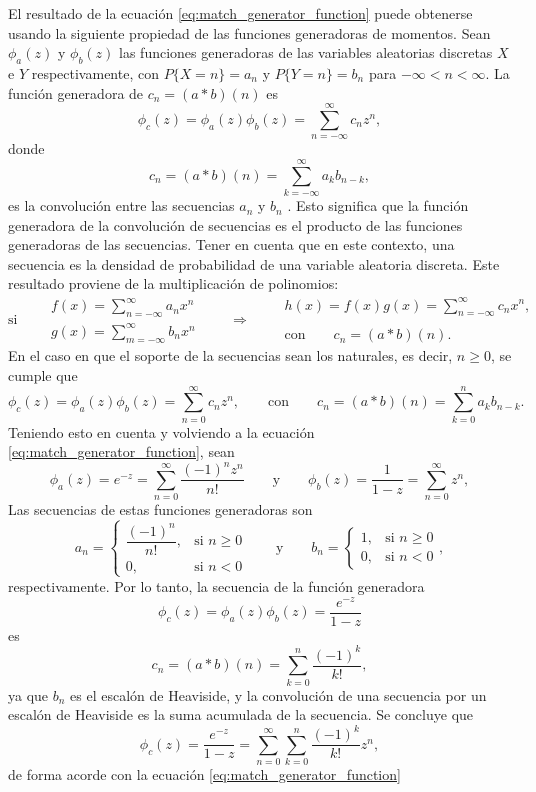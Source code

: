 \documentclass[a4paper]{report}
\begin{document}
El resultado de la ecuación \ref{eq:match_generator_function} puede obtenerse usando la siguiente propiedad de las funciones generadoras de momentos. Sean \(\phi_a(z)\) y \(\phi_b(z)\) las funciones generadoras de las variables aleatorias discretas \(X\) e \(Y\) respectivamente, con \(P\{X=n\}=a_n\) y \(P\{Y=n\}=b_n\) para \(-\infty<n<\infty\). La función generadora de \(c_n=(a*b)(n)\) es
\[
 \phi_c(z)=\phi_a(z)\phi_b(z)=\sum_{n=-\infty}^{\infty}c_nz^n,
\]
donde
\[
 c_n=(a*b)(n)=\sum_{k=-\infty}^{\infty}a_kb_{n-k},
\]
es la convolución entre las secuencias \(a_n\) y \(b_n\) \cite{miller2017probability_chap19}. Esto significa que la función generadora de la convolución de secuencias es el producto de las funciones generadoras de las secuencias. Tener en cuenta que en este contexto, una secuencia es la densidad de probabilidad de una variable aleatoria discreta. Este resultado proviene de la multiplicación de polinomios:
\[
  \textrm{si}\qquad
  \begin{array}{l} 
  \displaystyle f(x)=\sum_{n=-\infty}^{\infty}a_nx^n\\
  \displaystyle g(x)=\sum_{m=-\infty}^{\infty}b_nx^n \end{array}
  \qquad\Rightarrow\qquad 
  \begin{array}{l} 
  \displaystyle h(x)=f(x)g(x)=\sum_{n=-\infty}^{\infty}c_nx^n,\\
  \\
  \textrm{con}\qquad c_n=(a*b)(n). \end{array}
 \]
En el caso en que el soporte de la secuencias sean los naturales, es decir, \(n\geq0\), se cumple que
\[
 \phi_c(z)=\phi_a(z)\phi_b(z)=\sum_{n=0}^{\infty}c_nz^n,\qquad\textrm{con}\qquad c_n=(a*b)(n)=\sum_{k=0}^{n}a_kb_{n-k}.
\]
Teniendo esto en cuenta y volviendo a la ecuación \ref{eq:match_generator_function}, sean
\[
 \phi_a(z)=e^{-z}=\sum_{n=0}^{\infty}\frac{(-1)^nz^n}{n!}\qquad\textrm{y}\qquad 
 \phi_b(z)=\frac{1}{1-z}=\sum_{n=0}^{\infty}z^n,
\]
Las secuencias de estas funciones generadoras son
\[
 a_n=
 \left\{\begin{array}{ll}
  \dfrac{(-1)^n}{n!}, & \textrm{si }n\geq 0 \\
  0, & \textrm{si }n<0
 \end{array} \right.
 \qquad\textrm{y}\qquad
 b_n=
 \left\{\begin{array}{ll}
  1, & \textrm{si }n\geq 0 \\
  0, & \textrm{si }n<0
 \end{array}, \right.
\]
respectivamente. Por lo tanto, la secuencia de la función generadora
\[
 \phi_c(z)=\phi_a(z)\phi_b(z)=\frac{e^{-z}}{1-z}
\]
es
\[
 c_n=(a*b)(n)=\sum_{k=0}^{n}\frac{(-1)^k}{k!},
\]
ya que \(b_n\) es el escalón de Heaviside, y la convolución de una secuencia por un escalón de Heaviside es la suma acumulada de la secuencia. Se concluye que 
\[
 \phi_c(z)=\frac{e^{-z}}{1-z}=\sum_{n=0}^{\infty}\sum_{k=0}^{n}\frac{(-1)^k}{k!}z^n,
\]
de forma acorde con la ecuación \ref{eq:match_generator_function}
\end{document}
